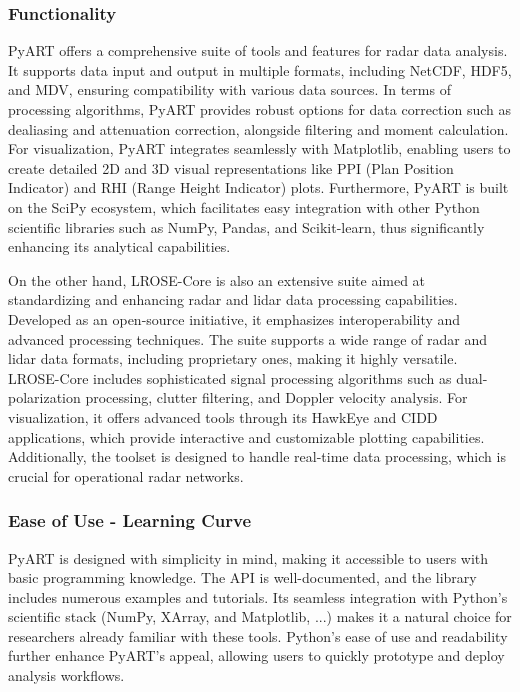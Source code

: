 \subsubsection*{Functionality}
PyART offers a comprehensive suite of tools and features for radar data
analysis. It supports data input and output in multiple formats, including
NetCDF, HDF5, and MDV, ensuring compatibility with various data sources. In
terms of processing algorithms, PyART provides robust options for data
correction such as dealiasing and attenuation correction, alongside filtering
and moment calculation. For visualization, PyART integrates seamlessly with
Matplotlib, enabling users to create detailed 2D and 3D visual representations
like PPI (Plan Position Indicator) and RHI (Range Height Indicator) plots.
Furthermore, PyART is built on the SciPy ecosystem, which facilitates easy
integration with other Python scientific libraries such as NumPy, Pandas, and
Scikit-learn, thus significantly enhancing its analytical capabilities.

On the other hand, LROSE-Core is also an extensive suite aimed at standardizing
and enhancing radar and lidar data processing capabilities. Developed as an
open-source initiative, it emphasizes interoperability and advanced processing
techniques. The suite supports a wide range of radar and lidar data formats,
including proprietary ones, making it highly versatile. LROSE-Core includes
sophisticated signal processing algorithms such as dual-polarization processing,
clutter filtering, and Doppler velocity analysis. For visualization, it offers
advanced tools through its HawkEye and CIDD applications, which provide
interactive and customizable plotting capabilities. Additionally, the toolset is
designed to handle real-time data processing, which is crucial for operational
radar networks.

\subsubsection*{Ease of Use - Learning Curve}
PyART is designed with simplicity in mind, making it accessible to users with
basic programming knowledge. The API is well-documented, and the library
includes numerous examples and tutorials. Its seamless integration with Python's
scientific stack (NumPy, XArray, and Matplotlib, ...) makes it a natural choice
for researchers already familiar with these tools. Python's ease of use and
readability further enhance PyART's appeal, allowing users to quickly prototype
and deploy analysis workflows.

